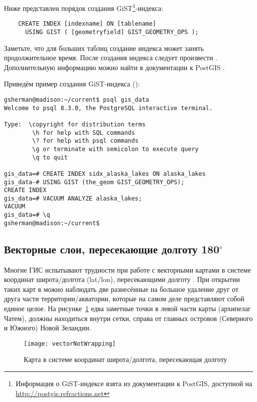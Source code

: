 Ниже представлен порядок создания GiST\footnote{Информация о GiST-индексе
взята из документации к PostGIS, доступной на
\url{http://postgis.refractions.net}}-индекса:

\begin{verbatim}
    CREATE INDEX [indexname] ON [tablename]
      USING GIST ( [geometryfield] GIST_GEOMETRY_OPS );
\end{verbatim}

Заметьте, что для больших таблиц создание индекса может занять
продолжительное время. После создания индекса следует произвести
. Дополнительную информацию можно найти в
документации к PostGIS \cite{PostGISweb}.

Приведём пример создания GiST-индекса (\nix):
\begin{verbatim}
gsherman@madison:~/current$ psql gis_data
Welcome to psql 8.3.0, the PostgreSQL interactive terminal.

Type:  \copyright for distribution terms
        \h for help with SQL commands
        \? for help with psql commands
        \g or terminate with semicolon to execute query
        \q to quit

gis_data=# CREATE INDEX sidx_alaska_lakes ON alaska_lakes
gis_data-# USING GIST (the_geom GIST_GEOMETRY_OPS);
CREATE INDEX
gis_data=# VACUUM ANALYZE alaska_lakes;
VACUUM
gis_data=# \q
gsherman@madison:~/current$
\end{verbatim}

\subsection{Векторные слои, пересекающие долготу 180$^\circ$}

Многие ГИС испытывают трудности при работе с векторными картами в системе
координат широта/долгота (lat/lon), пересекающими долготу .
При открытии таких карт в \qg можно наблюдать две разнесённые на большое
удаление друг от друга части территории/акватории, которые на самом деле
представляют собой единое целое. На рисунке~\ref{fig:vector_not_wrapping}
едва заметные точки в левой части карты (архипелаг Чатем), должны
находиться внутри сетки, справа от главных островов (Северного и Южного)
Новой Зеландии.

\begin{figure}[ht]
   \centering
   \texttt{[image: vectorNotWrapping]}
      \caption{Карта в системе координат широта/долгота, пересекающая долготу  \wincaption}
   \label{fig:vector_not_wrapping}
\end{figure}

